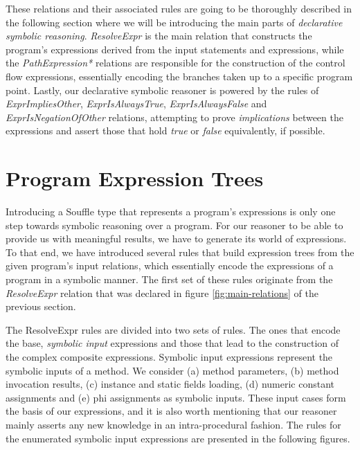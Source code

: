 These relations and their associated rules are going to be thoroughly described in the
following section where we will be introducing the main parts of \emph{declarative symbolic reasoning}.
\emph{ResolveExpr} is the main relation that constructs the program's expressions derived
from the input statements and expressions, while the \emph{PathExpression*} relations are responsible
for the construction of the control flow expressions, essentially encoding the
branches taken up to a specific program point. Lastly, our declarative symbolic reasoner
is powered by the rules of \emph{ExprImpliesOther}, \emph{ExprIsAlwaysTrue}, \emph{ExprIsAlwaysFalse}
and \emph{ExprIsNegationOfOther} relations, attempting to prove \emph{implications} between the expressions
and assert those that hold \emph{true} or \emph{false} equivalently, if possible.

\section{Program Expression Trees}\label{s:pets}


Introducing a Souffle type that represents a program's expressions is only one
step towards symbolic reasoning over a program. For our reasoner to be able to provide us
with meaningful results, we have to generate its world of expressions. To that end, we
have introduced several rules that build expression trees from the given program's
input relations, which essentially encode the expressions of a program in a symbolic
manner. The first set of these rules originate from the \emph{ResolveExpr} relation
that was declared in figure \ref{fig:main-relations} of the previous section.

The ResolveExpr rules are divided into two sets of rules. The ones that encode
the base, \emph{symbolic input} expressions and those that lead to the construction of the
complex composite expressions. Symbolic input expressions represent the
symbolic inputs of a method. We consider (a) method parameters, (b) method invocation
results, (c) instance and static fields loading, (d) numeric constant assignments and
(e) phi assignments as symbolic inputs. These input cases form the basis of our
expressions, and it is also worth mentioning that our reasoner mainly asserts any new
knowledge in an intra-procedural fashion. The rules for the enumerated symbolic
input expressions are presented in the following figures.

